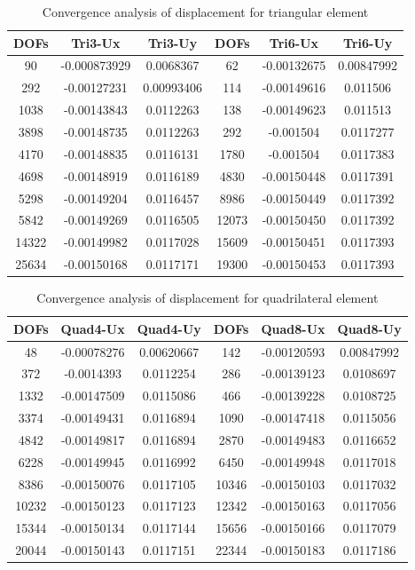 \begin{table}[ht]
		\caption{Convergence analysis of displacement for triangular element}
		\label{tab: TriConvergence}
\begin{tabular}{ c | c | c | c | c | c} 	
	DOFs & Tri3-Ux & Tri3-Uy & DOFs &Tri6-Ux & Tri6-Uy\\ \hline
	90 & -0.000873929 & 0.0068367 & 62 & -0.00132675 & 0.00847992  \\ 
	292 & -0.00127231 & 0.00993406 & 114 & -0.00149616 & 0.011506 \\
	1038 & -0.00143843 & 0.0112263 & 138 & -0.00149623 & 0.011513  \\
	3898 & -0.00148735 &  0.0112263&  292 & -0.001504 & 0.0117277 \\
	4170 & -0.00148835 &  0.0116131&  1780 & -0.001504 & 0.0117383\\
	4698 & -0.00148919 &  0.0116189& 4830 & -0.00150448 & 0.0117391  \\
	5298 & -0.00149204 &  0.0116457& 8986 & -0.00150449 & 0.0117392 \\
	5842 & -0.00149269 &  0.0116505&  12073 & -0.00150450 & 0.0117392\\
	14322 & -0.00149982 & 0.0117028& 15609 & -0.00150451 & 0.0117393 \\
	25634 & -0.00150168 & 0.0117171 & 19300 &  -0.00150453 &  0.0117393\\
	\hline  
\end{tabular}
\end{table}


\begin{table}[ht]
	\caption{Convergence analysis of displacement for quadrilateral element} \label{tab: QuadConvergence}
	\begin{tabular}{ c | c | c | c | c | c} 	
		DOFs & Quad4-Ux & Quad4-Uy & DOFs &Quad8-Ux & Quad8-Uy\\ \hline
		48 & -0.00078276 & 0.00620667 & 142 & -0.00120593 & 0.00847992  \\ 
		372 & -0.0014393 & 0.0112254 & 286 & -0.00139123& 0.0108697 \\
		1332 & -0.00147509 & 0.0115086 & 466 & -0.00139228 & 0.0108725  \\
		3374 & -0.00149431 &  0.0116894&  1090 & -0.00147418& 0.0115056 \\
		4842 & -0.00149817 &  0.0116894&  2870 &-0.00149483 & 0.0116652\\
		6228 & -0.00149945 &  0.0116992& 6450 &  -0.00149948 & 0.0117018  \\
		8386 & -0.00150076 &   0.0117105& 10346 &  -0.00150103 & 0.0117032 \\
		10232 & -0.00150123 &  0.0117123&  12342 & -0.00150163 & 0.0117056\\
		15344 &-0.00150134 & 0.0117144& 15656 & -0.00150166 & 0.0117079 \\
		20044 & -0.00150143 & 0.0117151 & 22344 &  -0.00150183 &  0.0117186\\
		\hline  
	\end{tabular}
\end{table}

